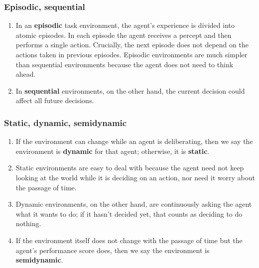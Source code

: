 \subsubsection{Episodic, sequential}
\begin{enumerate}
    \item In an \textbf{episodic} task environment, the agent’s experience is divided into atomic episodes. In each episode the agent receives a percept and then performs a single action. Crucially, the next episode does not depend on the actions taken in previous episodes. Episodic environments are much simpler than sequential environments because the agent does not need to think ahead.
    \hfill \cite{ai/book/Artificial-Intelligence-A-Modern-Approach/Russell-Norvig}
    
    \item In \textbf{sequential} environments, on the other hand, the current decision could affect all future decisions.
    \hfill \cite{ai/book/Artificial-Intelligence-A-Modern-Approach/Russell-Norvig}
\end{enumerate}


\subsubsection{Static, dynamic, semidynamic}
\begin{enumerate}
    \item If the environment can change while an agent is deliberating, then we say the environment is \textbf{dynamic} for that agent; otherwise, it is \textbf{static}.
    \hfill \cite{ai/book/Artificial-Intelligence-A-Modern-Approach/Russell-Norvig}

    \item Static environments are easy to deal with because the agent need not keep looking at the world while it is deciding on an action, nor need it worry about the passage of time. 
    \hfill \cite{ai/book/Artificial-Intelligence-A-Modern-Approach/Russell-Norvig}
    
    \item  Dynamic environments, on the other hand, are continuously asking the agent what it wants to do; if it hasn’t decided yet, that counts as deciding to do nothing. 
    \hfill \cite{ai/book/Artificial-Intelligence-A-Modern-Approach/Russell-Norvig}

    \item If the environment itself does not change with the passage of time but the agent’s performance score does, then we say the environment is \textbf{semidynamic}.
    \hfill \cite{ai/book/Artificial-Intelligence-A-Modern-Approach/Russell-Norvig}
\end{enumerate}


